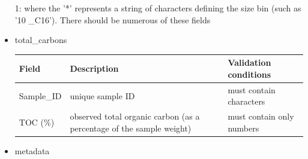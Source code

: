 \documentclass[
  8pt,
  a4paper]{article}
\begin{document}
\begin{itemize}
  1: where the '*' represents a string of characters defining the size
  bin (such as '10 \_C16'). There should be numerous of these fields
\item
  total\_carbons

  \begin{longtable}[]{@{}
    >{\raggedright\arraybackslash}p{}
    >{\raggedright\arraybackslash}p{}
    >{\raggedright\arraybackslash}p{}@{}}
  \toprule\noalign{}
  \begin{minipage}[b]{\linewidth}\raggedright
  Field
  \end{minipage} & \begin{minipage}[b]{\linewidth}\raggedright
  Description
  \end{minipage} & \begin{minipage}[b]{\linewidth}\raggedright
  Validation conditions
  \end{minipage} \\
  \midrule\noalign{}
  \endhead
  \bottomrule\noalign{}
  \endlastfoot
  Sample\_ID & unique sample ID & must contain characters \\
  TOC (\%) & observed total organic carbon (as a percentage of the
  sample weight) & must contain only numbers \\
  \end{longtable}
\item
  metadata


\end{itemize}
\end{document}
